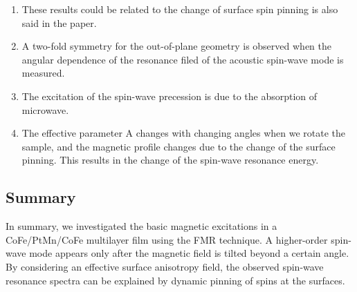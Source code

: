 \begin{enumerate}
    \item These results could be related to the change of surface spin pinning is also said in the paper.
    \item A two-fold symmetry for the out-of-plane geometry is observed when the angular dependence of the resonance filed of the acoustic spin-wave mode is measured.
    \item The excitation of the spin-wave precession is due to the absorption of microwave. 
    \item The effective parameter A changes with changing angles when we rotate the sample, and the magnetic profile changes due to the change of the surface pinning. This results in the change of the spin-wave resonance energy.    
\end{enumerate}
\subsection*{Summary}
In summary, we investigated the basic magnetic excitations in a CoFe/PtMn/CoFe multilayer film using the FMR technique. A higher-order spin-wave mode appears only after the magnetic field is tilted beyond a certain angle. By considering an effective surface anisotropy field, the observed spin-wave resonance spectra can be explained by dynamic pinning of spins at the surfaces.


